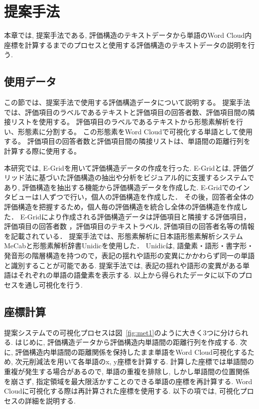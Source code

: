 \documentclass[syuuron]{kuee}
\begin{document}
\chapter{提案手法}
	本章では, 提案手法である, 評価構造のテキストデータから単語のWord Cloud内座標を計算するまでのプロセスと使用する評価構造のテキストデータの説明を行う. 
	
	\section{使用データ}
		この節では、提案手法で使用する評価構造データについて説明する。
		提案手法では、評価項目のラベルであるテキストと評価項目の回答者数、評価項目間の隣接リストを使用する。
		評価項目のラベルであるテキストから形態素解析を行い、形態素に分割する。
		この形態素をWord Cloudで可視化する単語として使用する。
		評価項目の回答者数と評価項目間の隣接リストは、単語間の距離行列を計算する際に使用する。
		
		本研究では, E-Gridを用いて評価構造データの作成を行った. 
		E-Gridとは, 評価グリッド法に基づいた評価構造の抽出や分析をビジュアル的に支援するシステムであり, 
		評価構造を抽出する機能から評価構造データを作成した. 
		E-Gridでのインタビューは1人ずつで行い，個人の評価構造を作成した．
		その後，回答者全体の評価構造を把握するため，個人毎の評価構造を統合し全体の評価構造を作成した．
		E-Gridにより作成される評価構造データは評価項目と隣接する評価項目，評価項目の回答者数 ，評価項目のテキストラベル, 評価項目の回答者名等の情報を記載されている．
		提案手法では、形態素解析に日本語形態素解析システムMeCab\cite{mcb1}と形態素解析辞書Unidicを使用した．
		Unidicは, 語彙素・語形・書字形・発音形の階層構造を持つので，表記の揺れや語形の変異にかかわらず同一の単語と識別することが可能である. 
		提案手法では, 表記の揺れや語形の変異がある単語はそれぞれの単語の語彙素を表示する. 
		以上から得られたデータに以下のプロセスを通し可視化を行う. 		
		
	\section{座標計算}
		提案システムでの可視化プロセスは図~\ref{fig:met1}のように大きく3つに分けられる. 
		はじめに, 評価構造データから評価構造内単語間の距離行列を作成する. 
		次に, 評価構造内単語間の距離関係を保持したまま単語をWord Cloud可視化するため, 次元削減法を用いて各単語のx, y座標を計算する. 
		計算した座標では単語間の重複が発生する場合があるので, 
		単語の重複を排除し, しかし単語間の位置関係を崩さず, 指定領域を最大限活かすことのできる単語の座標を再計算する. 
		Word Cloudに可視化する際は再計算された座標を使用する. 
		以下の項では, 可視化プロセスの詳細を説明する. 
		
\end{document}
